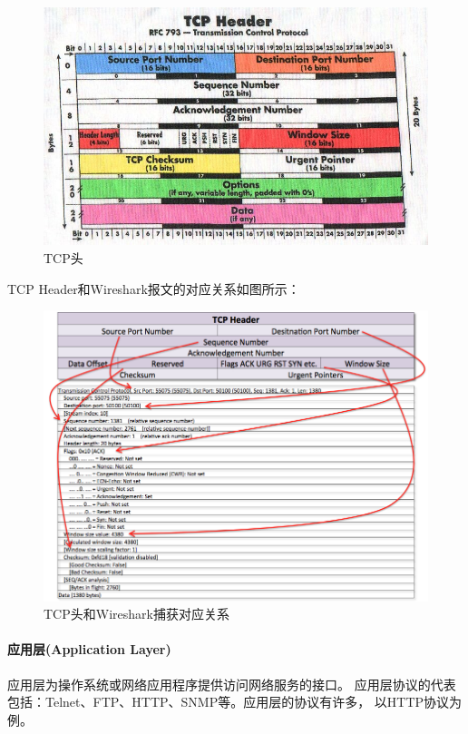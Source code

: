 \documentclass{book}
\begin{document}
\begin{figure}[htbp]
	\centering
	\includegraphics[scale=0.6]{TCPHeaderStructure.jpg}
	\caption{TCP头}
	\label{fig:TCPHeaderStructure}
\end{figure}


TCP Header和Wireshark报文的对应关系如图所示：

\begin{figure}[htbp]
	\centering
	\includegraphics[scale=0.4]{TCPHeaderAndWireshark.jpg}
	\caption{TCP头和Wireshark捕获对应关系}
	\label{fig:TCPHeaderAndWireshark}
\end{figure}

\paragraph{应用层(Application Layer)}应用层为操作系统或网络应用程序提供访问网络服务的接口。
应用层协议的代表包括：Telnet、FTP、HTTP、SNMP等。应用层的协议有许多，
以HTTP协议为例。
\end{document}
